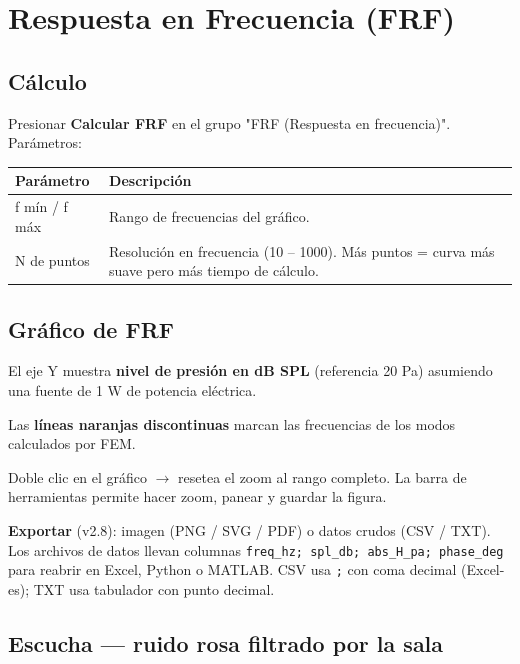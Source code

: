 \documentclass[11pt, a4paper]{article}
\newenvironment{consejo}[1][Consejo]{%
  \begin{tcolorbox}[mybox=cTeal, title={#1}]%
}{\end{tcolorbox}}
\newcommand{\menu}[1]{\textbf{\guillemotleft #1\guillemotright}}
\begin{document}
\section{Respuesta en Frecuencia (FRF)}

\subsection{Cálculo}

Presionar \menu{Calcular FRF} en el grupo "FRF (Respuesta en frecuencia)".
Parámetros:

\begin{tabular}{lp{9cm}}
  \toprule
  Parámetro & Descripción \\
  \midrule
  f mín / f máx & Rango de frecuencias del gráfico. \\
  N\textordmasculine{} de puntos & Resolución en frecuencia (10 – 1000). Más puntos = curva más
    suave pero más tiempo de cálculo. \\
  \bottomrule
\end{tabular}

\subsection{Gráfico de FRF}

El eje Y muestra \textbf{nivel de presión en dB SPL} (referencia 20 \textmu{}Pa)
asumiendo una fuente de 1 W de potencia eléctrica.

Las \textbf{líneas naranjas discontinuas} marcan las frecuencias de los modos
calculados por FEM.

\begin{consejo}
  Doble clic en el gráfico $\to$ resetea el zoom al rango completo.
  La barra de herramientas permite hacer zoom, panear y guardar la figura.
\end{consejo}

\textbf{Exportar} (v2.8): imagen (PNG / SVG / PDF) o datos crudos
(CSV / TXT). Los archivos de datos llevan columnas
\texttt{freq\_hz; spl\_db; abs\_H\_pa; phase\_deg} para reabrir en
Excel, Python o MATLAB. CSV usa \texttt{;} con coma decimal
(Excel-es); TXT usa tabulador con punto decimal.

\subsection{Escucha — ruido rosa filtrado por la sala}
\end{document}
